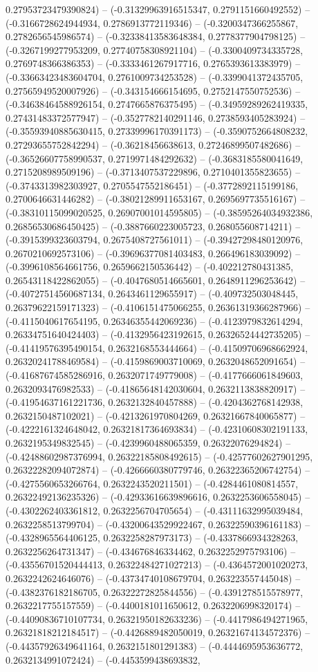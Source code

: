 0.27953723479390824) -- (-0.31329963916515347, 0.2791151660492552) -- (-0.3166728624944934, 0.2786913772119346) -- (-0.3200347366255867, 0.2782656545986574) -- (-0.32338413583648384, 0.2778377904798125) -- (-0.3267199277953209, 0.27740758308921104) -- (-0.3300409734335728, 0.2769748366386353) -- (-0.3333461267917716, 0.2765393613383979) -- (-0.33663423483604704, 0.2761009734253528) -- (-0.3399041372435705, 0.27565949520007926) -- (-0.343154666154695, 0.2752147550752536) -- (-0.34638464588926154, 0.2747665876375495) -- (-0.34959289262419335, 0.27431483372577947) -- (-0.3527782140291146, 0.2738593405283924) -- (-0.35593940885630415, 0.27339996170391173) -- (-0.3590752664808232, 0.27293655752842294) -- (-0.36218456638613, 0.27246899507482686) -- (-0.36526607758990537, 0.2719971484292632) -- (-0.3683185580041649, 0.2715208989509196) -- (-0.3713407537229896, 0.2710401355823655) -- (-0.3743313982303927, 0.2705547552186451) -- (-0.3772892115199186, 0.2700646631446282) -- (-0.38021289911653167, 0.2695697735516167) -- (-0.38310115099020525, 0.26907001014595805) -- (-0.38595264034932386, 0.26856530686450425) -- (-0.3887660223005723, 0.268055608714211) -- (-0.3915399323603794, 0.2675408727561011) -- (-0.39427298480120976, 0.2670210692573106) -- (-0.39696377081403483, 0.266496183039092) -- (-0.3996108564661756, 0.2659662150536442) -- (-0.402212780431385, 0.26543118422862055) -- (-0.4047680514665601, 0.2648911296253642) -- (-0.40727514560687134, 0.2643461129655917) -- (-0.409732503048445, 0.26379622159171323) -- (-0.4106151475066255, 0.26361319366287966) -- (-0.4115040617654195, 0.26346355442069236) -- (-0.4123979832614294, 0.26334751640424403) -- (-0.4132956423192615, 0.26326524442735205) -- (-0.41419576395490154, 0.2632168553444664) -- (-0.41509706968662924, 0.26320241788469584) -- (-0.4159869003710069, 0.2632048652091654) -- (-0.41687674585286916, 0.2632071749779008) -- (-0.4177666061849603, 0.2632093476982533) -- (-0.41865648142030604, 0.2632113838820917) -- (-0.41954637161221736, 0.2632132840457888) -- (-0.4204362768142938, 0.2632150487102021) -- (-0.4213261970804269, 0.26321667840065877) -- (-0.4222161324648042, 0.26321817364693834) -- (-0.42310608302191133, 0.2632195349832545) -- (-0.4239960488065359, 0.26322076294824) -- (-0.42488602987376994, 0.26322185808492615) -- (-0.42577602627901295, 0.26322282094072874) -- (-0.4266660380779746, 0.26322365206742754) -- (-0.4275560653266764, 0.2632243520211501) -- (-0.4284461080814557, 0.26322492136235326) -- (-0.42933616639896616, 0.2632253606558045) -- (-0.4302262403361812, 0.2632256704705654) -- (-0.43111632995039484, 0.2632258513799704) -- (-0.43200643529922467, 0.26322590396161183) -- (-0.4328965564406125, 0.2632258287973173) -- (-0.4337866934328263, 0.2632256264731347) -- (-0.434676846334462, 0.2632252975793106) -- (-0.43556701520444413, 0.26322484271027213) -- (-0.4364572001020273, 0.2632242624646076) -- (-0.43734740108679704, 0.263223557445048) -- (-0.4382376182186705, 0.26322272825844556) -- (-0.4391278515578977, 0.2632217755157559) -- (-0.4400181011650612, 0.2632206998320174) -- (-0.44090836710107734, 0.26321950182633236) -- (-0.4417986494271965, 0.26321818212184517) -- (-0.4426889482050019, 0.26321674134572376) -- (-0.44357926349641164, 0.2632151801291383) -- (-0.4444695953636772, 0.2632134991072424) -- (-0.4453599438693832, 